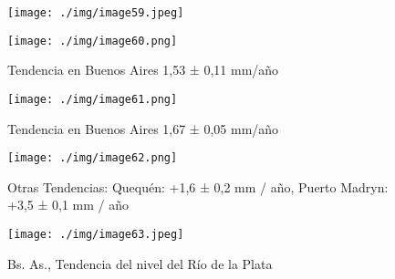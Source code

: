 \documentclass[
  a4paper,12pt]{extarticle}
\begin{document}
\begin{figure}
\begin{center}
\null\hfill\begin{minipage}{0.7\textwidth}

\texttt{[image: ./img/image59.jpeg]}

\end{minipage}\hfill\null
\begin{minipage}{0.48\textwidth}

\texttt{[image: ./img/image60.png]}

\caption{Tendencia en Buenos Aires 1,53 ± 0,11 mm/año}
\end{minipage}%
\begin{minipage}{0.48\textwidth}

\texttt{[image: ./img/image61.png]}

\caption{Tendencia en Buenos Aires 1,67 ± 0,05 mm/año}
\end{minipage}
\end{center}
\end{figure}

\begin{figure}
\centering
\texttt{[image: ./img/image62.png]}
\caption{Otras Tendencias: Quequén: +1,6 ± 0,2 mm / año, Puerto Madryn:
+3,5 ± 0,1 mm / año}
\end{figure}

\begin{figure}
\centering
\texttt{[image: ./img/image63.jpeg]}
\caption{Bs. As., Tendencia del nivel del Río de la Plata}
\end{figure}
\end{document}
